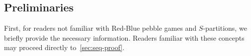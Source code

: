 \documentclass[sigplan,review,anonymous]{acmart}\settopmatter{printfolios=true,printccs=false,printacmref=false}
\newcommand\greg[1]{\textcolor{blue}{[Greg: #1]}}
\newcommand\mac[1]{\textcolor{red}{[Mac: #1]}}
\newcommand{\macb}[1]{\textbf{\textsf{#1}}}
\begin{document}
%
%

%
%
%

%

\subsection{Preliminaries}

First, for readers not familiar with Red-Blue pebble games and
$S$-partitions, we briefly provide the necessary information.
Readers familiar with these concepts may proceed directly 
to~\cref{sec:seq-proof}.
\end{document}
